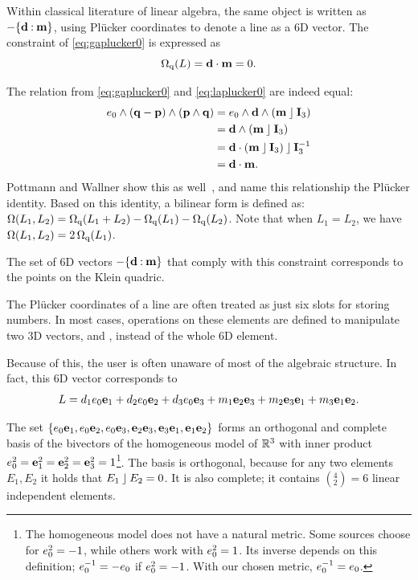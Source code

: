 Within classical literature of linear algebra, the same object is written as $-\{\mathbf{d} \mathbin{:} \mathbf{m}\}$, using Pl\"ucker coordinates to denote a line as a 6D vector.  The constraint of \autoref{eq:gaplucker0} is expressed as 
\begin{equation} \label{eq:laplucker0}
  \operatorname{\Omega_q}(L) = \mathbf{d} \mathbin{\cdot} \mathbf{m} = 0 .
\end{equation}

The relation from \autoref{eq:gaplucker0} and \autoref{eq:laplucker0} are indeed equal:
\begin{align*}
  e_0 \wedge (\mathbf{q} - \mathbf{p}) \wedge (\mathbf{p} \wedge \mathbf{q}) 
  &= e_0 \wedge \mathbf{d} \wedge (\mathbf{m} \mathbin{\rfloor} \mathbf{I}_3) \\
  &= \mathbf{d} \wedge (\mathbf{m} \mathbin{\rfloor} \mathbf{I}_3) \\
  &= \mathbf{d} \mathbin{\cdot} (\mathbf{m} \mathbin{\rfloor} \mathbf{I}_3) \mathbin{\rfloor} \mathbf{I}_3^{-1} \\
  &= \mathbf{d} \mathbin{\cdot} \mathbf{m} .
\end{align*}
Pottmann and Wallner show this as well~\cite[Lemma 2.1.2]{Pottmann}, and name this relationship the Pl\"ucker identity.  Based on this identity, a bilinear form is defined as: $\operatorname{\Omega}(L_1, L_2) = \operatorname{\Omega_q}(L_1 + L_2) - \operatorname{\Omega_q}(L_1) - \operatorname{\Omega_q}(L_2)$.  Note that when $L_1 = L_2$, we have $\operatorname{\Omega}(L_1, L_2) = 2 \operatorname{\Omega_q}(L_1)$.


The set of 6D vectors $-\{\mathbf{d} \mathbin{:} \mathbf{m}\}$ that comply with this constraint corresponds to the points on the Klein quadric.

The Pl\"ucker coordinates of a line are often treated as just six slots for storing numbers.  In most cases, operations on these elements are defined to manipulate two 3D vectors,  and , instead of the whole 6D element.  

Because of this, the user is often unaware of most of the algebraic structure.  In fact, this 6D vector corresponds to
\begin{equation*}
  L = d_1 e_0\mathbf{e}_1 + d_2 e_0\mathbf{e}_2 + d_3 e_0\mathbf{e}_3 + m_1 \mathbf{e}_2\mathbf{e}_3 + m_2 \mathbf{e}_3\mathbf{e}_1 + m_3 \mathbf{e}_1\mathbf{e}_2 .
\end{equation*}

The set $\{e_0\mathbf{e}_1, e_0\mathbf{e}_2, e_0\mathbf{e}_3, \mathbf{e}_2\mathbf{e}_3, \mathbf{e}_3\mathbf{e}_1, \mathbf{e}_1\mathbf{e}_2\}$ forms an orthogonal and complete basis of the bivectors of the homogeneous model of $\mathbb{R}^3$ with inner product $e_0^2 = \mathbf{e}_1^2 = \mathbf{e}_2^2 = \mathbf{e}_3^2 = 1$\footnote{The homogeneous model does not have a natural metric.  Some sources choose for $e_0^2 = -1$, while others work with $e_0^2 = 1$.  Its inverse depends on this definition; $e_0^{-1} = -e_0$ if $e_0^2 = -1$.  With our chosen metric, $e_0^{-1} = e_0$.}.  The basis is orthogonal, because for any two elements $E_1, E_2$ it holds that $E_1 \mathbin{\rfloor} E_2 = 0$. It is also complete; it contains $(^4_2) = 6$ linear independent elements.

